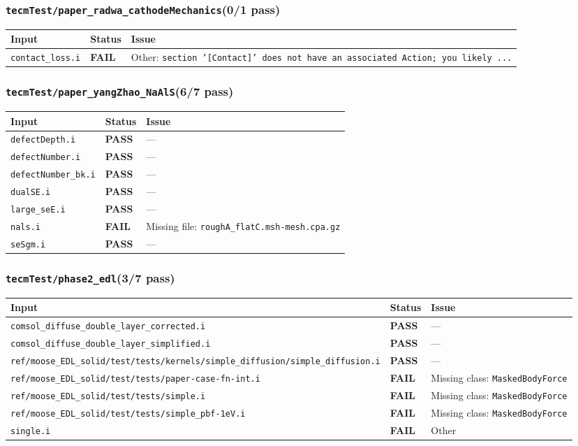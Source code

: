 \documentclass[10pt,letterpaper]{article}
\newcommand{\PASS}{\textcolor{passgreen}{\textbf{PASS}}}
\newcommand{\FAIL}{\textcolor{failred}{\textbf{FAIL}}}
\newcommand{\code}[1]{\texttt{\small #1}}
\begin{document}
\subsubsection{\code{tecmTest/paper\_radwa\_cathodeMechanics}\hfill (0/1 pass)}
\begin{longtable}{p{} l p{}}
\toprule
Input & Status & Issue \\
\midrule
\endhead
\code{contact\_loss.i} & \FAIL & Other: \code{section '[Contact]' does not have an associated Action; you likely ...} \\
\bottomrule
\end{longtable}

\subsubsection{\code{tecmTest/paper\_yangZhao\_NaAlS}\hfill (6/7 pass)}
\begin{longtable}{p{} l p{}}
\toprule
Input & Status & Issue \\
\midrule
\endhead
\code{defectDepth.i} & \PASS & --- \\
\code{defectNumber.i} & \PASS & --- \\
\code{defectNumber\_bk.i} & \PASS & --- \\
\code{dualSE.i} & \PASS & --- \\
\code{large\_seE.i} & \PASS & --- \\
\code{nals.i} & \FAIL & Missing file: \code{roughA\_flatC.msh-mesh.cpa.gz} \\
\code{seSgm.i} & \PASS & --- \\
\bottomrule
\end{longtable}

\subsubsection{\code{tecmTest/phase2\_edl}\hfill (3/7 pass)}
\begin{longtable}{p{} l p{}}
\toprule
Input & Status & Issue \\
\midrule
\endhead
\code{comsol\_diffuse\_double\_layer\_corrected.i} & \PASS & --- \\
\code{comsol\_diffuse\_double\_layer\_simplified.i} & \PASS & --- \\
\code{ref/moose\_EDL\_solid/test/tests/kernels/simple\_diffusion/simple\_diffusion.i} & \PASS & --- \\
\code{ref/moose\_EDL\_solid/test/tests/paper-case-fn-int.i} & \FAIL & Missing class: \code{MaskedBodyForce} \\
\code{ref/moose\_EDL\_solid/test/tests/simple.i} & \FAIL & Missing class: \code{MaskedBodyForce} \\
\code{ref/moose\_EDL\_solid/test/tests/simple\_pbf-1eV.i} & \FAIL & Missing class: \code{MaskedBodyForce} \\
\code{single.i} & \FAIL & Other \\
\bottomrule
\end{longtable}
\end{document}
